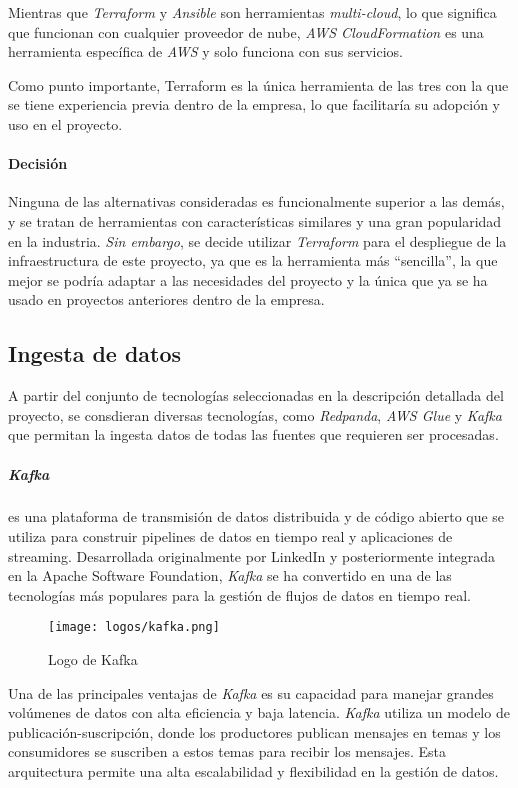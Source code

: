 Mientras que \textit{Terraform} y \textit{Ansible} son herramientas
\textit{multi-cloud}, lo que significa que funcionan con cualquier proveedor de
nube, \textit{AWS CloudFormation} es una herramienta específica de \textit{AWS}
y solo funciona con sus servicios.

Como punto importante, Terraform es la única herramienta de las tres con la que
se tiene experiencia previa dentro de la empresa, lo que facilitaría su
adopción y uso en el proyecto.

\paragraph{Decisión}
Ninguna de las alternativas consideradas es funcionalmente superior a las demás,
y se tratan de herramientas con características similares y una gran popularidad
en la industria. \textit{Sin embargo}, se decide utilizar \textit{Terraform}
para el despliegue de la infraestructura de este proyecto, ya que es la
herramienta más ``sencilla'', la que mejor se podría adaptar a las necesidades
del proyecto y la única que ya se ha usado en proyectos anteriores dentro de la
empresa.


\newpage{}
\subsection{Ingesta de datos}\label{subsec:alt_ingesta}
A partir del conjunto de tecnologías seleccionadas en la descripción detallada
del proyecto, se consdieran diversas tecnologías, como \textit{Redpanda},
\textit{AWS Glue} y \textit{Kafka} que permitan la ingesta datos de todas las
fuentes que requieren ser procesadas.


\subparagraph{Kafka} es una plataforma de transmisión de datos distribuida y de
código abierto que se utiliza para construir pipelines de datos en tiempo real y
aplicaciones de streaming. Desarrollada originalmente por LinkedIn y
posteriormente integrada en la Apache Software Foundation, \textit{Kafka} se ha
convertido en una de las tecnologías más populares para la gestión de flujos de
datos en tiempo real.

\begin{figure}[H]
	\centering
	\texttt{[image: logos/kafka.png]}
	\caption{Logo de Kafka~\textregistered}
	\label{fig:kafka}
\end{figure}

Una de las principales ventajas de \textit{Kafka} es su capacidad para manejar
grandes volúmenes de datos con alta eficiencia y baja latencia. \textit{Kafka}
utiliza un modelo de publicación-suscripción, donde los productores publican
mensajes en temas y los consumidores se suscriben a estos temas para recibir
los mensajes. Esta arquitectura permite una alta escalabilidad y flexibilidad
en la gestión de datos.

